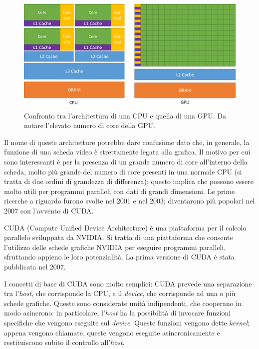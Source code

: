 \documentclass[12pt,a4paper,openright,twoside]{report}
\begin{document}
\begin{figure}[h]
\centering{}
\includegraphics[width=\textwidth]{cpu-gpu-comparison.png}
\caption[Confronto tra CPU e GPU]{Confronto tra l'architettura di una CPU e quella di una GPU. Da notare l'elevato numero di core della GPU.}
\label{img:cpu-gpu-comparison}
\end{figure}

Il nome di queste architetture potrebbe dare confusione dato che, in generale, la funzione di una scheda video è strettamente legata alla grafica. Il motivo per cui sono interessanti è per la presenza di un grande numero di core all'interno della scheda, molto più grande del numero di core presenti in una normale CPU (si tratta di due ordini di grandezza di differenza); questo implica che possono essere molto utili per programmi paralleli con dati di grandi dimensioni. Le prime ricerche a riguardo furono svolte nel 2001 e nel 2003; diventarono più popolari nel 2007 con l'avvento di CUDA.

CUDA (Compute Unified Device Architecture) è una piattaforma per il calcolo parallelo sviluppata da NVIDIA. Si tratta di una piattaforma che consente l'utilizzo delle schede grafiche NVIDIA per eseguire programmi paralleli, sfruttando appieno le loro potenzialità. La prima versione di CUDA è stata pubblicata nel 2007.

I concetti di base di CUDA sono molto semplici: CUDA prevede una separazione tra l'\textit{host}, che corrisponde la CPU, e il \textit{device}, che corrisponde ad una o più schede grafiche. Queste sono considerate unità indipendenti, che cooperano in modo asincrono: in particolare, l'\textit{host} ha la possibilità di invocare funzioni specifiche che vengono eseguite sul \textit{device}. Queste funzioni vengono dette \textit{kernel}; appena vengono chiamate, queste vengono eseguite asincronicamente e restituiscono subito il controllo all'\textit{host}.
\end{document}
